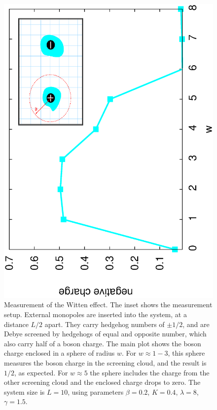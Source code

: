 \documentclass[prb,twocolumn]{revtex4-1}
\newcommand{\scripty}[1]{w}
\begin{document}
\begin{figure}
\includegraphics[angle=-90,width=0.9\linewidth]{figures/wittenout.eps}
\caption{Measurement of the Witten effect. The inset shows the measurement setup. External monopoles are inserted into the system, at a distance $L/2$ apart. They carry hedgehog numbers of $\pm 1/2$, and are Debye screened by hedgehogs of equal and opposite number, which also carry half of a boson charge. The main plot shows the boson charge enclosed in a sphere of radius $\scripty{r}$. For $\scripty{r}\approx 1-3$, this sphere measures the boson charge in the screening cloud, and the result is $1/2$, as expected. For $\scripty{r}\approx 5$ the sphere includes the charge from the other screening cloud and the enclosed charge drops to zero. The system size is $L=10$, using parameters $\beta=0.2$, $K=0.4$, $\lambda=8$, $\gamma=1.5$.}
\label{witten}
\end{figure}
\end{document}
